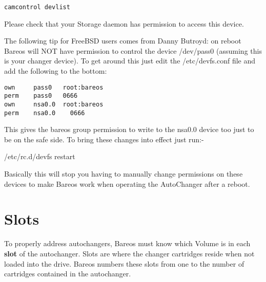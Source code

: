 \footnotesize
\begin{verbatim}
camcontrol devlist
\end{verbatim}
\normalsize

Please check that your Storage daemon has permission to access this
device.

The following tip for FreeBSD users comes from Danny Butroyd:
on reboot Bareos will NOT have permission to
control the device /dev/pass0 (assuming this is your changer device).
To get around this just edit the /etc/devfs.conf file and add the
following to the bottom:
\footnotesize
\begin{verbatim}
own     pass0   root:bareos
perm    pass0   0666
own     nsa0.0  root:bareos
perm    nsa0.0    0666
\end{verbatim}
\normalsize

This gives the bareos group permission to write to the nsa0.0 device
too just to be on the safe side.   To bring these changes into effect
just run:-

/etc/rc.d/devfs restart

Basically this will stop you having to manually change permissions on these
devices to make Bareos work when operating the AutoChanger after a reboot.

%


\section{Slots}
\label{Slots}

To properly address autochangers, Bareos must know which Volume is in each
{\bf slot} of the autochanger. Slots are where the changer cartridges reside
when not loaded into the drive. Bareos numbers these slots from one to the
number of cartridges contained in the autochanger.

